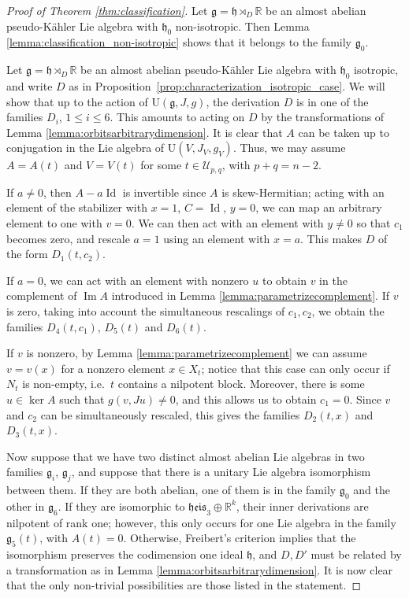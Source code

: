 \documentclass{article}
\theoremstyle{definition}
\DeclareMathOperator{\Id}{Id}
\newcommand{\R}{\mathbb{R}}
\newcommand{\frg}{\mathfrak{g}}
\newcommand{\frh}{\mathfrak{h}}
\renewcommand{\Im}{\operatorname{Im}}
\newcommand{\lie}[1]{\mathfrak{#1}}
\newcommand{\g}{\lie g}
\begin{document}
\begin{proof}[Proof of Theorem \ref{thm:classification}]
    Let $\g=\frh\rtimes_D\R$ be an almost abelian pseudo-Kähler Lie algebra with $\frh_0$ non-isotropic. Then Lemma \ref{lemma:classification_non-isotropic} shows that it belongs to the family $\frg_0$.\medskip

    Let $\g=\frh\rtimes_D\R$ be an almost abelian pseudo-Kähler Lie algebra with $\frh_0$ isotropic, and write $D$ as in Proposition~\ref{prop:characterization_isotropic_case}. We will show that up to the action of $\mathrm{U}(\g,J,g)$, the derivation $D$ is in one of the families $D_i$, $1\leq i\leq 6$. This amounts to acting on $D$ by the transformations of Lemma \ref{lemma:orbitsarbitrarydimension}. It is clear that $A$ can be taken up to conjugation in the Lie algebra of $\mathrm{U}(V,J_V,g_V)$. Thus, we may assume $A=A(t)$ and $V=V(t)$ for some $t\in\mathcal{U}_{p,q}$, with $p+q=n-2$.\medskip

    If $a\neq0$, then $A-a\Id$ is invertible since $A$ is skew-Hermitian; acting with an element of the stabilizer with $x=1$, $C=\Id$, $y=0$, we can map an arbitrary element to one with $v=0$. We can then act with an element with $y\neq0$ so that $c_1$ becomes zero, and rescale $a=1$ using an element with $x=a$. This makes $D$ of the form $D_1(t,c_2)$.\medskip

    If $a=0$, we can act with an element with nonzero $u$ to obtain $v$ in the complement of $\Im A$ introduced in Lemma \ref{lemma:parametrizecomplement}. If $v$ is zero, taking into account the simultaneous rescalings of $c_1,c_2$, we obtain the families $D_4(t,c_1)$, $D_5(t)$ and $D_6(t)$.\medskip

    If $v$ is nonzero, by Lemma \ref{lemma:parametrizecomplement} we can assume $v=v(x)$ for a nonzero element $x\in X_t$; notice that this case can only occur if $N_t$ is non-empty, i.e.\ $t$ contains a nilpotent block. Moreover, there is some $u\in\ker A$ such that $g(v,Ju)\neq0$, and this allows us to obtain $c_1=0$. Since $v$ and $c_2$ can be simultaneously rescaled, this gives the families $D_2(t,x)$ and $D_3(t,x)$.\medskip

    Now suppose that we have two distinct almost abelian Lie algebras in two families $\g_i$, $\g_j$, and suppose that there is a unitary Lie algebra isomorphism between them. If they are both abelian, one of them is in the family $\g_0$ and the other in $\g_6$. If they are isomorphic to $\mathfrak{heis}_3\oplus\R^k$, their inner derivations are nilpotent of rank one; however, this only occurs for one Lie algebra in the family $\g_5(t)$, with $A(t)=0$. Otherwise, Freibert's criterion implies that the isomorphism preserves the codimension one ideal $\frh$, and $D,D'$ must be related by a transformation as in Lemma \ref{lemma:orbitsarbitrarydimension}. It is now clear that the only non-trivial possibilities are those listed in the statement.
\end{proof}
\end{document}
